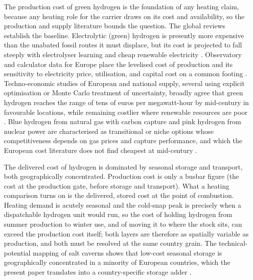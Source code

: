 The production cost of green hydrogen is the foundation of any heating claim,
because any heating role for the carrier draws on its cost and availability, so
the production and supply literature bounds the question. The global
reviews establish the baseline. Electrolytic (green) hydrogen is presently more
expensive than the unabated fossil routes it must displace, but its cost is
projected to fall steeply with electrolyser learning and cheap renewable
electricity \citep{IEAHydrogenReview2022,IEA2025hydrogenreview}. Observatory and
calculator data for Europe place the levelised cost of production and its
sensitivity to electricity price, utilisation, and capital cost on a common
footing \citep{EHO2024hydrogencosts,EHO2024lcohcalculator}.
Techno-economic studies of European and national supply, several using explicit
optimisation or Monte Carlo treatment of uncertainty, broadly agree that green
hydrogen reaches the range of tens of euros per megawatt-hour by mid-century in
favourable locations, while remaining costlier where renewable resources are poor
\citep{Sens2022Cost,Zun2023Cost}. Blue hydrogen from natural gas
with carbon capture and pink hydrogen from nuclear power are characterised as
transitional or niche options whose competitiveness depends on gas prices and
capture performance, and which the European cost literature does not find cheapest
at mid-century \citep{IEAGHG2022blue,Staffell2018Hydrogen}.

The delivered cost of hydrogen is dominated by seasonal storage and transport,
both geographically concentrated. Production cost is only a busbar figure (the cost
at the production gate, before storage and transport). What a heating comparison turns on is the delivered, stored cost at the point of combustion.
Heating demand is acutely seasonal and the cold-snap peak is precisely when a
dispatchable hydrogen unit would run, so the cost of holding hydrogen from summer
production to winter use, and of moving it to where the stock sits, can exceed the
production cost itself; both layers are therefore as spatially variable as
production, and both must be resolved at the same country grain. The
technical-potential mapping of salt caverns shows that low-cost seasonal storage is
geographically concentrated in a minority of European countries, which the present
paper translates into a country-specific storage adder \citep{Caglayan2020caverns}.


